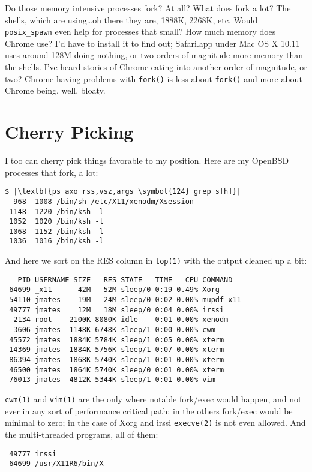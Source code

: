 \documentclass[10pt,a4paper]{article}
\begin{document}
Do those memory intensive processes fork? At all? What does fork a lot?
The shells, which are using\ldots oh there they are, 1888K, 2268K, etc.
Would \texttt{posix\_spawn} even help for processes that small? How much
memory does Chrome use? I'd have to install it to find out; Safari.app
under Mac OS X 10.11 uses around 128M doing nothing, or two orders of
magnitude more memory than the shells. I've heard stories of Chrome
eating into another order of magnitude, or two? Chrome having problems
with \texttt{fork()} is less about \texttt{fork()} and more about Chrome
being, well, bloaty.

\section*{Cherry Picking}

I too can cherry pick things favorable to my position. Here are my
OpenBSD processes that fork, a lot:

\begin{lstlisting}
$ |\textbf{ps axo rss,vsz,args \symbol{124} grep s[h]}|
  968  1008 /bin/sh /etc/X11/xenodm/Xsession
 1148  1220 /bin/ksh -l
 1052  1020 /bin/ksh -l
 1068  1152 /bin/ksh -l
 1036  1016 /bin/ksh -l
\end{lstlisting}

And here we sort on the RES column in \texttt{top(1)} with the output
cleaned up a bit:

\begin{lstlisting}
   PID USERNAME SIZE   RES STATE   TIME   CPU COMMAND
 64699 _x11      42M   52M sleep/0 0:19 0.49% Xorg
 54110 jmates    19M   24M sleep/0 0:02 0.00% mupdf-x11
 49777 jmates    12M   18M sleep/0 0:04 0.00% irssi
  2134 root    2100K 8080K idle    0:01 0.00% xenodm
  3606 jmates  1148K 6748K sleep/1 0:00 0.00% cwm
 45572 jmates  1884K 5784K sleep/1 0:05 0.00% xterm
 14369 jmates  1884K 5756K sleep/1 0:07 0.00% xterm
 86394 jmates  1868K 5740K sleep/1 0:01 0.00% xterm
 46500 jmates  1864K 5740K sleep/0 0:01 0.00% xterm
 76013 jmates  4812K 5344K sleep/1 0:01 0.00% vim
\end{lstlisting}

\texttt{cwm(1)} and \texttt{vim(1)} are the only where notable fork/exec
would happen, and not ever in any sort of performance critical path; in
the others fork/exec would be minimal to zero; in the case of Xorg and
irssi \texttt{execve(2)} is not even allowed. And the multi-threaded
programs, all of them:

\begin{lstlisting}
 49777 irssi
 64699 /usr/X11R6/bin/X
\end{lstlisting}
\end{document}
